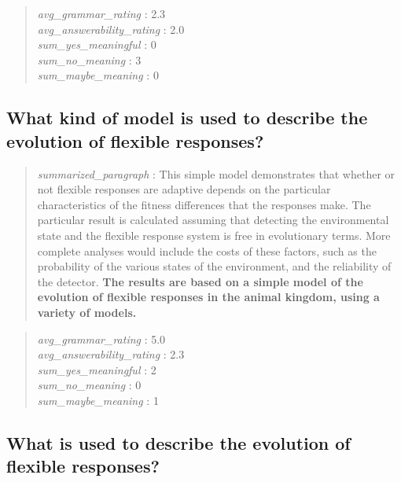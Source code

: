 \begin{quote}
\emph{avg\_grammar\_rating} : 2.3\\
\emph{avg\_answerability\_rating} : 2.0\\
\emph{sum\_yes\_meaningful} : 0\\
\emph{sum\_no\_meaning} : 3\\
\emph{sum\_maybe\_meaning} : 0
\end{quote}

\hypertarget{what-kind-of-model-is-used-to-describe-the-evolution-of-flexible-responses}{%
\subsection{What kind of model is used to describe the evolution of
flexible
responses?}\label{what-kind-of-model-is-used-to-describe-the-evolution-of-flexible-responses}}

\begin{quote}
\emph{summarized\_paragraph} : This simple model demonstrates that
whether or not flexible responses are adaptive depends on the particular
characteristics of the fitness differences that the responses make. The
particular result is calculated assuming that detecting the
environmental state and the flexible response system is free in
evolutionary terms. More complete analyses would include the costs of
these factors, such as the probability of the various states of the
environment, and the reliability of the detector. \textbf{The results
are based on a simple model of the evolution of flexible responses in
the animal kingdom, using a variety of models.}
\end{quote}

\begin{quote}
\emph{avg\_grammar\_rating} : 5.0\\
\emph{avg\_answerability\_rating} : 2.3\\
\emph{sum\_yes\_meaningful} : 2\\
\emph{sum\_no\_meaning} : 0\\
\emph{sum\_maybe\_meaning} : 1
\end{quote}

\hypertarget{what-is-used-to-describe-the-evolution-of-flexible-responses}{%
\subsection{What is used to describe the evolution of flexible
responses?}\label{what-is-used-to-describe-the-evolution-of-flexible-responses}}

